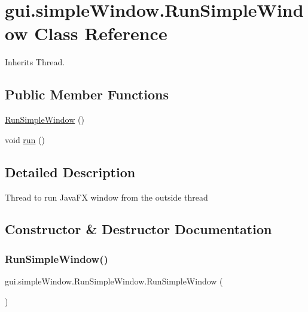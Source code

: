 \hypertarget{classgui_1_1simple_window_1_1_run_simple_window}{}\section{gui.\+simple\+Window.\+Run\+Simple\+Window Class Reference}
\label{classgui_1_1simple_window_1_1_run_simple_window}


Inherits Thread.

\subsection*{Public Member Functions}
\begin{DoxyCompactItemize}
\item 
\hyperlink{classgui_1_1simple_window_1_1_run_simple_window_a57efcae7cd5db1297d4f2dc0eb8b8e26}{Run\+Simple\+Window} ()
\item 
void \hyperlink{classgui_1_1simple_window_1_1_run_simple_window_ad80b6825105574d0a327c90580869957}{run} ()
\end{DoxyCompactItemize}


\subsection{Detailed Description}
Thread to run Java\+FX window from the outside thread 

\subsection{Constructor \& Destructor Documentation}
\mbox{\label{classgui_1_1simple_window_1_1_run_simple_window_a57efcae7cd5db1297d4f2dc0eb8b8e26}} 
\subsubsection{\texorpdfstring{Run\+Simple\+Window()}{RunSimpleWindow()}}
{\footnotesize\ttfamily gui.\+simple\+Window.\+Run\+Simple\+Window.\+Run\+Simple\+Window (\begin{DoxyParamCaption}{ }\end{DoxyParamCaption})}

